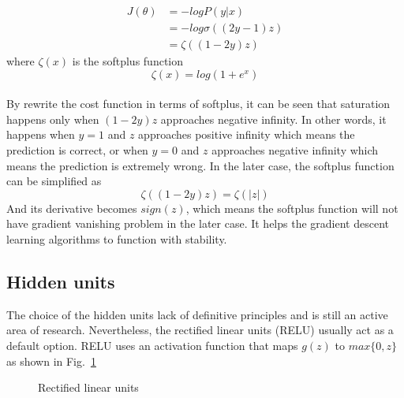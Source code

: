 \begin{equation}
    \begin{aligned}
        J(\theta) &= -logP(y|x) \\
        & = -log \sigma ((2y-1)z) \\
        & = \zeta ((1-2y)z)
    \end{aligned}
\end{equation}
where $\zeta(x)$ is the softplus function 
\begin{equation}
    \zeta(x) = log(1+e^x)
\end{equation}

\paragraph{}
By rewrite the cost function in terms of softplus, it can be seen that saturation happens only when $(1-2y)z$ approaches negative infinity.
In other words, it happens when $y=1$ and $z$ approaches positive infinity which means the prediction is correct, or when $y=0$ and $z$ approaches negative infinity which means the prediction is extremely wrong.
In the later case, the softplus function can be simplified as
\begin{equation}
    \zeta((1-2y)z) = \zeta(|z|)
\end{equation}
And its derivative becomes $sign(z)$, which means the softplus function will not have gradient vanishing problem in the later case.
It helps the gradient descent learning algorithms to function with stability.

\subsection{Hidden units}
The choice of the hidden units lack of definitive principles and is still an active area of research.
Nevertheless, the rectified linear units (RELU) usually act as a default option.
RELU uses an activation function that maps $g(z)$ to $max\{0,z\}$ as shown in Fig.~\ref{lr_fig:ml_relu}
\begin{figure}[!ht]
    \centering
    \caption{Rectified linear units}
    \label{lr_fig:ml_relu}
\end{figure}

